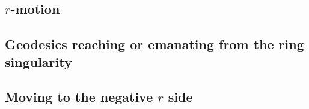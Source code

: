 


\subsection{$r$-motion}

\subsection{Geodesics reaching or emanating from the ring singularity}

\subsection{Moving to the negative $r$ side}


